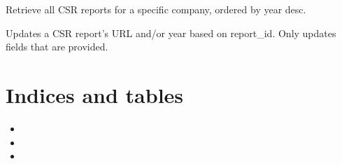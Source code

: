 \documentclass[letterpaper,10pt,english]{sphinxmanual}
\begin{document}
\begin{fulllineitems}
\begin{fulllineitems}
\end{fulllineitems}


\begin{fulllineitems}
\label{\detokenize{src:src.db_utils.postgres.PostgreSQLDB.get_csr_reports_by_company}}
\pysigstartsignatures
{}
\pysigstopsignatures
\sphinxAtStartPar
Retrieve all CSR reports for a specific company, ordered by year desc.

\end{fulllineitems}


\begin{fulllineitems}
\label{\detokenize{src:src.db_utils.postgres.PostgreSQLDB.update_csr_report}}
\pysigstartsignatures
{}
\pysigstopsignatures
\sphinxAtStartPar
Updates a CSR report’s URL and/or year based on report\_id.
Only updates fields that are provided.

\end{fulllineitems}


\end{fulllineitems}



\chapter{Indices and tables}
\label{\detokenize{index:indices-and-tables}}\begin{itemize}
\item {} 
\sphinxAtStartPar
{}

\item {} 
\sphinxAtStartPar
{}

\item {} 
\sphinxAtStartPar
{}

\end{itemize}
\end{document}
